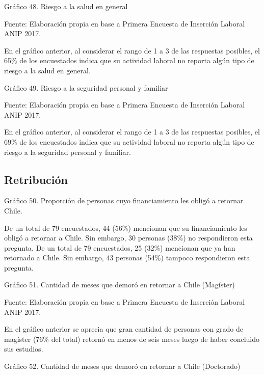 \documentclass{article}
\begin{document}
Gráfico 48. Riesgo a la salud en general


Fuente: Elaboración propia en base a Primera Encuesta de Inserción Laboral ANIP 2017.

En el gráfico anterior, al considerar el rango de 1 a 3 de las respuestas posibles, el 65\% de los encuestados indica que su actividad laboral no reporta algún tipo de riesgo a la salud en general.

Gráfico 49. Riesgo a la seguridad personal y familiar


Fuente: Elaboración propia en base a Primera Encuesta de Inserción Laboral ANIP 2017.

En el gráfico anterior, al considerar el rango de 1 a 3 de las respuestas posibles, el 69\% de los encuestados indica que su actividad laboral no reporta algún tipo de riesgo a la seguridad personal y familiar.

\subsection{Retribución} 

Gráfico 50. Proporción de personas cuyo financiamiento les obligó a retornar Chile.


De un total de 79 encuestados, 44 (56\%) mencionan que su financiamiento les obligó a retornar a Chile. Sin embargo, 30 personas (38\%) no respondieron esta pregunta. De un total de 79 encuestados, 25 (32\%) mencionan que ya han retornado a Chile. Sin embargo, 43 personas (54\%) tampoco respondieron esta pregunta.

Gráfico 51. Cantidad de meses que demoró en retornar a Chile (Magíster)


Fuente: Elaboración propia en base a Primera Encuesta de Inserción Laboral ANIP 2017.

En el gráfico anterior se aprecia que gran cantidad de personas con grado de magíster (76\% del total) retornó en menos de seis meses luego de haber concluido sus estudios.

Gráfico 52. Cantidad de meses que demoró en retornar a Chile (Doctorado)

\end{document}
